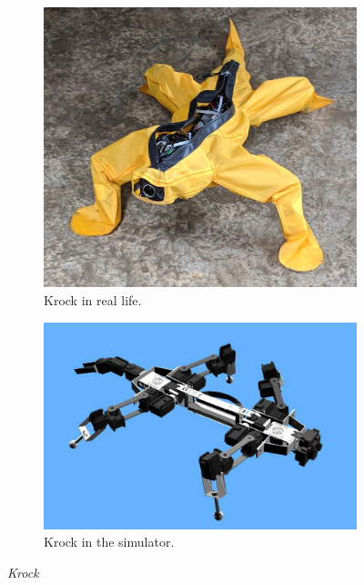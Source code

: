 \documentclass[../document.tex]{subfiles}
\begin{document}
\begin{figure}[htbp]
    \centering
         \begin{subfigure}[b]{0.45\textwidth}
        \includegraphics[width=\textwidth]{../img/krock-real.jpg}
        \caption{Krock in real life.}
    \end{subfigure}
         \begin{subfigure}[b]{0.45\textwidth}
          \includegraphics[width=\textwidth]{../img/krock-1.jpg}
          \caption{Krock in the simulator.}
        \end{subfigure}
           \caption{\emph{Krock}}
           \label{fig: krock}

    \end{figure}
\end{document}
